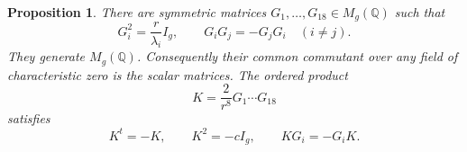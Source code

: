 \documentclass[11pt]{article}
\numberwithin{equation}{section}
\newtheorem{proposition}[theorem]{Proposition}
\theoremstyle{definition}
\theoremstyle{remark}
\begin{document}
\begin{proposition}\label{prop:clifford-matrices}
There are symmetric matrices $G_1,\ldots,G_{18}\in M_g(\mathbb Q)$ such that
\begin{equation}\label{eq:clifford-relations}
 G_i^2=\frac r{\lambda_i}I_g,\qquad
 G_iG_j=-G_jG_i\quad(i\ne j).
\end{equation}
They generate $M_g(\mathbb Q)$.  Consequently their common commutant over any
field of characteristic zero is the scalar matrices.  The ordered
product
\begin{equation}\label{eq:K-definition}
 K=\frac{2}{r^8}G_1\cdots G_{18}
\end{equation}
satisfies
\begin{equation}\label{eq:K-identities}
 K^t=-K,\qquad K^2=-cI_g,\qquad KG_i=-G_iK.
\end{equation}
\end{proposition}
\end{document}
